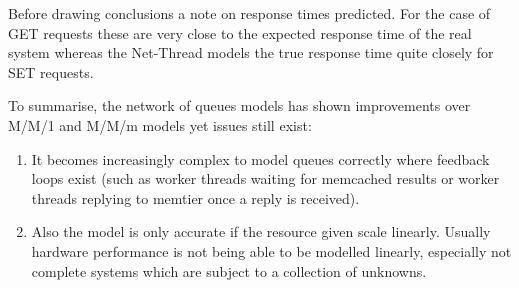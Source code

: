                 Before drawing conclusions a note on response times predicted. For the case of GET requests these are
                very close to the expected response time of the real system whereas the Net-Thread models the true
                response time quite closely for SET requests. 

                To summarise, the network of queues models has shown improvements over M/M/1 and M/M/m models yet issues
                still exist:
                \begin{enumerate}
                    \item It becomes increasingly complex to model queues correctly where feedback loops exist (such as
                          worker threads waiting for memcached results or worker threads replying to memtier once a
                          reply is received).
                    \item Also the model is only accurate if the resource given scale linearly. Usually hardware
                          performance is not being able to be modelled linearly, especially not complete systems which
                          are subject to a collection of unknowns.
                \end{enumerate}
